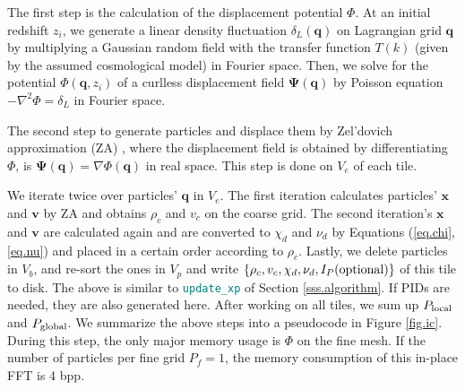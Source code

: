 \documentclass[10pt,twocolumn,preprint]{emulateapj}
\newcommand{\bs}{\boldsymbol}
\newcommand{\tcx}{\textcolor{teal}}
\begin{document}
The first step is the calculation of the displacement potential $\Phi$. At an initial redshift $z_i$, we generate a linear density fluctuation $\delta_L({\bs q})$ on Lagrangian grid ${\bs q}$ by multiplying a Gaussian random field with the transfer function $T(k)$ (given by the assumed cosmological model) in Fourier space. Then, we solve for the potential ${\Phi({\bs q}, z_i)}$ of a curlless displacement field ${\bs\Psi({\bs q})}$ by Poisson equation $-\nabla^2\Phi=\delta_L$ in Fourier space.

The second step to generate particles and displace them by Zel'dovich approximation (ZA) \citep{1970A&A.....5...84Z}, where the displacement field is obtained by differentiating $\Phi$, is ${\bs \Psi}({\bs q})=\nabla\Phi({\bs q})$ in real space. This step is done on $V_e$ of each tile. 

We iterate twice over particles' ${\bs q}$ in $V_e$. The first iteration calculates particles' ${\bs x}$ and ${\bs v}$ by ZA and obtains $\rho_c$ and $v_c$ on the coarse grid. The second iteration's ${\bs x}$ and ${\bs v}$ are calculated again and are converted to $\chi_d$ and $\nu_d$ by Equations (\ref{eq.chi},\ref{eq.nu}) and placed in a certain order according to $\rho_c$. Lastly, we delete particles in $V_b$, and re-sort the ones in $V_p$ and write $\{\rho_c,v_c,\chi_d,\nu_d,I_P({\rm optional})\}$ of this tile to disk. The above is similar to {\tt \tcx{update\_xp}} of Section \ref{sss.algorithm}. If PIDs are needed, they are also generated here.
After working on all tiles, we sum up $P_{\rm local}$ and $P_{\rm global}$. We summarize the above steps into a pseudocode in Figure \ref{fig.ic}. During this step, the only major memory usage is $\Phi$ on the fine mesh. If the number of particles per fine grid $P_f=1$, the memory consumption of this in-place FFT is 4 bpp.
\end{document}
